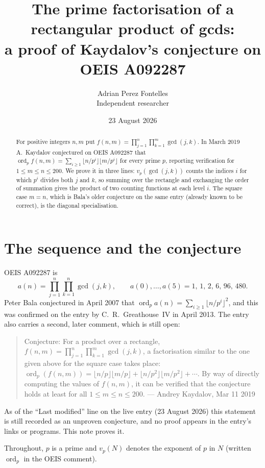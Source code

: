 \documentclass[11pt,a4paper]{article}
\title{The prime factorisation of a rectangular product of gcds:\\
a proof of Kaydalov's conjecture on OEIS A092287}
\author{Adrian Perez Fontelles\\ \small Independent researcher}
\date{23 August 2026}
\theoremstyle{plain}
\theoremstyle{definition}
\begin{document}
\maketitle

\begin{abstract}
For positive integers $n,m$ put $f(n,m)=\prod_{j=1}^{n}\prod_{k=1}^{m}\gcd(j,k)$. In March
2019 A.~Kaydalov conjectured on OEIS A092287 that
$\operatorname{ord}_p f(n,m)=\sum_{i\ge1}\lfloor n/p^i\rfloor\lfloor m/p^i\rfloor$ for every
prime $p$, reporting verification for $1\le m\le n\le200$. We prove it in three lines:
$v_p(\gcd(j,k))$ counts the indices $i$ for which $p^i$ divides both $j$ and $k$, so summing
over the rectangle and exchanging the order of summation gives the product of two counting
functions at each level $i$. The square case $m=n$, which is Bala's older conjecture on the
same entry (already known to be correct), is the diagonal specialisation.
\end{abstract}

\section{The sequence and the conjecture}

OEIS A092287 is
\[
a(n)=\prod_{j=1}^{n}\prod_{k=1}^{n}\gcd(j,k),\qquad
a(0),\dots,a(5)=1,\,1,\,2,\,6,\,96,\,480 .
\]
Peter Bala conjectured in April 2007 that $\operatorname{ord}_p a(n)=\sum_{i\ge1}\lfloor
n/p^i\rfloor^2$, and this was confirmed on the entry by C.~R.~Greathouse~IV in April 2013.
The entry also carries a second, later comment, which is still open:
\begin{quote}
Conjecture: For a product over a rectangle, $f(n,m)=\prod_{j=1}^{n}\prod_{k=1}^{m}\gcd(j,k)$,
a factorisation similar to the one given above for the square case takes place:
$\operatorname{ord}_p(f(n,m))=\lfloor n/p\rfloor\lfloor m/p\rfloor+\lfloor
n/p^2\rfloor\lfloor m/p^2\rfloor+\cdots$. By way of directly computing the values of
$f(n,m)$, it can be verified that the conjecture holds at least for all $1\le m\le n\le200$.
--- Andrey Kaydalov, Mar 11 2019
\end{quote}
As of the ``Last modified'' line on the live entry (23 August 2026) this statement is still
recorded as an unproven conjecture, and no proof appears in the entry's links or programs.
This note proves it.

Throughout, $p$ is a prime and $v_p(N)$ denotes the exponent of $p$ in $N$ (written
$\operatorname{ord}_p$ in the OEIS comment).
\end{document}
